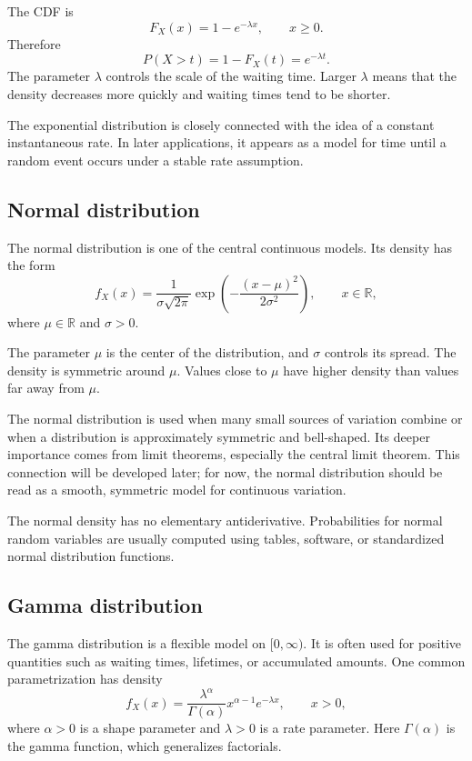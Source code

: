 The CDF is
\[
F_X(x)=1-e^{-\lambda x},\qquad x\geq0.
\]
Therefore
\[
P(X>t)=1-F_X(t)=e^{-\lambda t}.
\]
The parameter \(\lambda\) controls the scale of the waiting time. Larger
\(\lambda\) means that the density decreases more quickly and waiting times tend
to be shorter.

The exponential distribution is closely connected with the idea of a constant
instantaneous rate. In later applications, it appears as a model for time until a
random event occurs under a stable rate assumption.

\subsection*{Normal distribution}

The normal distribution is one of the central continuous models. Its density has
the form
\[
f_X(x)=\frac1{\sigma\sqrt{2\pi}}
\exp\left(-\frac{(x-
\mu)^2}{2\sigma^2}\right),
\qquad x\in\mathbb{R},
\]
where \(\mu\in\mathbb{R}\) and \(\sigma>0\).

The parameter \(\mu\) is the center of the distribution, and \(\sigma\) controls
its spread. The density is symmetric around \(\mu\). Values close to \(\mu\) have
higher density than values far away from \(\mu\).

The normal distribution is used when many small sources of variation combine or
when a distribution is approximately symmetric and bell-shaped. Its deeper
importance comes from limit theorems, especially the central limit theorem. This
connection will be developed later; for now, the normal distribution should be
read as a smooth, symmetric model for continuous variation.

\begin{remarkbox}
The normal density has no elementary antiderivative. Probabilities for normal
random variables are usually computed using tables, software, or standardized
normal distribution functions.
\end{remarkbox}

\subsection*{Gamma distribution}

The gamma distribution is a flexible model on \([0,\infty)\). It is often used for
positive quantities such as waiting times, lifetimes, or accumulated amounts. One
common parametrization has density
\[
f_X(x)=\frac{\lambda^\alpha}{\Gamma(\alpha)}x^{\alpha-1}e^{-\lambda x},
\qquad x>0,
\]
where \(\alpha>0\) is a shape parameter and \(\lambda>0\) is a rate parameter.
Here \(\Gamma(\alpha)\) is the gamma function, which generalizes factorials.

